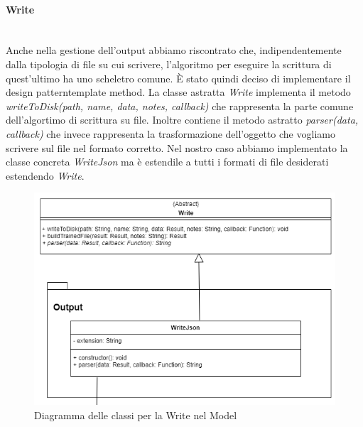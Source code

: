 		\paragraph*{Write} \mbox{} \\[1mm]
		Anche nella gestione dell'output abbiamo riscontrato che, indipendentemente dalla tipologia di file su cui scrivere, l'algoritmo per eseguire la scrittura di quest'ultimo ha uno scheletro comune. È stato quindi deciso di implementare il design pattern\glosp template method.
		La classe astratta \textit{Write} implementa il metodo \textit{writeToDisk(path, name, data, notes, callback)} che rappresenta la parte comune dell'algortimo di scrittura su file. Inoltre contiene il metodo astratto \textit{parser(data, callback)} che invece rappresenta la trasformazione dell'oggetto che vogliamo scrivere sul file nel formato corretto. Nel nostro caso abbiamo implementato la classe concreta \textit{WriteJson} ma è estendile a tutti i formati di file desiderati estendendo \textit{Write}.
		\mbox{}
				\begin{figure} [H]
					\begin{center}
						\includegraphics[width=120mm]{img/Diagrammi/write-app.png}
					\end{center}
					\caption{Diagramma delle classi per la Write nel Model}
				\end{figure}

